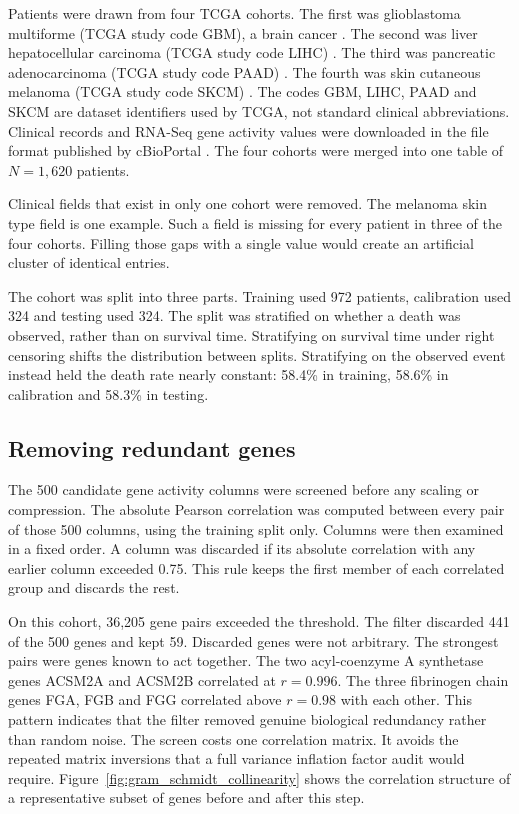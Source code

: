 \documentclass[10pt,a4paper]{article}
\begin{document}
Patients were drawn from four TCGA cohorts. The first was glioblastoma
multiforme (TCGA study code GBM), a brain cancer \citep{brennan2013somatic}. The
second was liver hepatocellular carcinoma (TCGA study code LIHC)
\citep{tcga2017hepatocellular}. The third was pancreatic adenocarcinoma (TCGA
study code PAAD) \citep{tcga2017pancreatic}. The fourth was skin cutaneous
melanoma (TCGA study code SKCM) \citep{tcga2015melanoma}. The codes GBM, LIHC,
PAAD and SKCM are dataset
identifiers used by TCGA, not standard clinical abbreviations. Clinical records
and RNA-Seq gene activity values were downloaded in the file format published by
cBioPortal \citep{cerami2012cbio, gao2013integrative}. The four cohorts were
merged into one table of $N = 1{,}620$ patients.

Clinical fields that exist in only one cohort were removed. The melanoma skin
type field is one example. Such a field is missing for every patient in three of
the four cohorts. Filling those gaps with a single value would create an
artificial cluster of identical entries.

The cohort was split into three parts. Training used 972 patients, calibration
used 324 and testing used 324. The split was stratified on whether a death was
observed, rather than on survival time. Stratifying on survival time under right
censoring shifts the distribution between splits. Stratifying on the observed
event instead held the death rate nearly constant: 58.4\% in training, 58.6\% in
calibration and 58.3\% in testing.

\subsection{Removing redundant genes}

The 500 candidate gene activity columns were screened before any scaling or
compression. The absolute Pearson correlation was computed between every pair of
those 500 columns, using the training split only. Columns were then examined in
a fixed order. A column was discarded if its absolute correlation with any
earlier column exceeded 0.75. This rule keeps the first member of each
correlated group and discards the rest.

On this cohort, 36,205 gene pairs exceeded the threshold. The filter discarded
441 of the 500 genes and kept 59. Discarded genes were not arbitrary. The
strongest pairs were genes known to act together. The two acyl-coenzyme A
synthetase genes ACSM2A and ACSM2B correlated at $r = 0.996$. The three
fibrinogen chain genes FGA, FGB and FGG correlated above $r = 0.98$ with each
other. This pattern indicates that the filter removed genuine biological
redundancy rather than random noise. The screen costs one correlation matrix. It
avoids the repeated matrix inversions that a full variance inflation factor
audit would require. Figure~\ref{fig:gram_schmidt_collinearity} shows the
correlation structure of a representative subset of genes before and after this
step.
\end{document}
